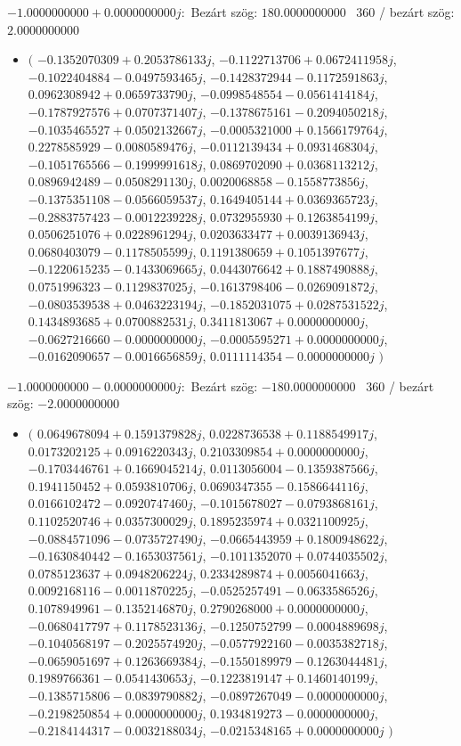 \documentclass[14pt,a4paper]{article}
\begin{document}
$-1.0000000000+0.0000000000j$:\
Bezárt szög: $180.0000000000$ \
360 / bezárt szög: $2.0000000000$\
\begin{itemize}
\item
$\big($
$-0.1352070309+0.2053786133j$, $-0.1122713706+0.0672411958j$, $-0.1022404884-0.0497593465j$, $-0.1428372944-0.1172591863j$, $0.0962308942+0.0659733790j$, $-0.0998548554-0.0561414184j$, $-0.1787927576+0.0707371407j$, $-0.1378675161-0.2094050218j$, $-0.1035465527+0.0502132667j$, $-0.0005321000+0.1566179764j$, $0.2278585929-0.0080589476j$, $-0.0112139434+0.0931468304j$, $-0.1051765566-0.1999991618j$, $0.0869702090+0.0368113212j$, $0.0896942489-0.0508291130j$, $0.0020068858-0.1558773856j$, $-0.1375351108-0.0566059537j$, $0.1649405144+0.0369365723j$, $-0.2883757423-0.0012239228j$, $0.0732955930+0.1263854199j$, $0.0506251076+0.0228961294j$, $0.0203633477+0.0039136943j$, $0.0680403079-0.1178505599j$, $0.1191380659+0.1051397677j$, $-0.1220615235-0.1433069665j$, $0.0443076642+0.1887490888j$, $0.0751996323-0.1129837025j$, $-0.1613798406-0.0269091872j$, $-0.0803539538+0.0463223194j$, $-0.1852031075+0.0287531522j$, $0.1434893685+0.0700882531j$, $0.3411813067+0.0000000000j$, $-0.0627216660-0.0000000000j$, $-0.0005595271+0.0000000000j$, $-0.0162090657-0.0016656859j$, $0.0111114354-0.0000000000j$
$\big)$
\end{itemize}
$-1.0000000000-0.0000000000j$:\
Bezárt szög: $-180.0000000000$ \
360 / bezárt szög: $-2.0000000000$\
\begin{itemize}
\item
$\big($
$0.0649678094+0.1591379828j$, $0.0228736538+0.1188549917j$, $0.0173202125+0.0916220343j$, $0.2103309854+0.0000000000j$, $-0.1703446761+0.1669045214j$, $0.0113056004-0.1359387566j$, $0.1941150452+0.0593810706j$, $0.0690347355-0.1586644116j$, $0.0166102472-0.0920747460j$, $-0.1015678027-0.0793868161j$, $0.1102520746+0.0357300029j$, $0.1895235974+0.0321100925j$, $-0.0884571096-0.0735727490j$, $-0.0665443959+0.1800948622j$, $-0.1630840442-0.1653037561j$, $-0.1011352070+0.0744035502j$, $0.0785123637+0.0948206224j$, $0.2334289874+0.0056041663j$, $0.0092168116-0.0011870225j$, $-0.0525257491-0.0633586526j$, $0.1078949961-0.1352146870j$, $0.2790268000+0.0000000000j$, $-0.0680417797+0.1178523136j$, $-0.1250752799-0.0004889698j$, $-0.1040568197-0.2025574920j$, $-0.0577922160-0.0035382718j$, $-0.0659051697+0.1263669384j$, $-0.1550189979-0.1263044481j$, $0.1989766361-0.0541430653j$, $-0.1223819147+0.1460140199j$, $-0.1385715806-0.0839790882j$, $-0.0897267049-0.0000000000j$, $-0.2198250854+0.0000000000j$, $0.1934819273-0.0000000000j$, $-0.2184144317-0.0032188034j$, $-0.0215348165+0.0000000000j$
$\big)$
\end{itemize}
\end{document}
